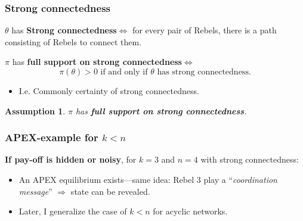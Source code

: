 \documentclass[9pt]{beamer}
\newtheorem{assumption}{Assumption}[section]
\begin{document}
\begin{frame}
  \frametitle{Strong connectedness}


\begin{definition}
$\theta$ has \textbf{Strong connectedness}$\Leftrightarrow$ for every pair of Rebels, there is a path consisting of Rebels to connect them.
\end{definition}  

\begin{definition}
$\pi$ has \textbf{full support on strong connectedness}$\Leftrightarrow$ 
\[\text{$\pi(\theta)>0$ if and only if $\theta$ has strong connectedness.}\]
\end{definition}  
\begin{itemize}
\item I.e. Commonly certainty of strong connectedness.
\end{itemize}
\pause
\begin{assumption}
$\pi$ has \textbf{full support on strong connectedness}.
\end{assumption}

\end{frame}


\begin{frame}
  \frametitle{APEX-example for $k<n$}

\alert{\textbf{If pay-off is hidden or noisy}}, for $k=3$ and $n=4$ with strong connectedness:
  \begin{center}
\end{center}

\begin{itemize}[<+->]
\item An APEX equilibrium exists---same idea: Rebel 3 play a ``\textit{coordination message}'' $\Rightarrow$ state can be revealed.
\item Later, I generalize the case of $k<n$ for acyclic networks. 
\end{itemize}

  
\end{frame}
\end{document}
